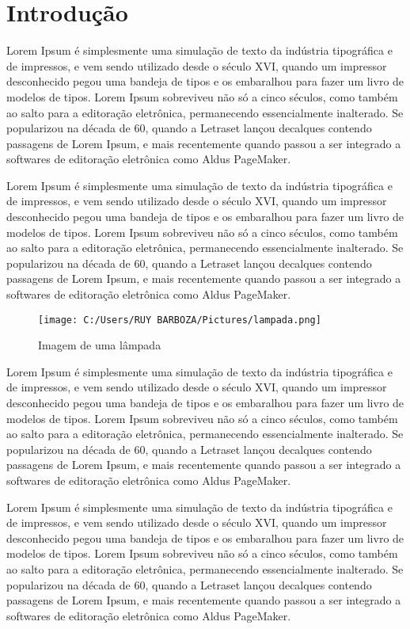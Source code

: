 \documentclass[12pt, a4paper, oneside]{book}
\begin{document}
\newpage

\chapter{Introdução}

Lorem Ipsum é simplesmente uma simulação de texto da indústria tipográfica e de impressos, e vem sendo utilizado desde o século XVI, quando um impressor desconhecido pegou uma bandeja de tipos e os embaralhou para fazer um livro de modelos de tipos. Lorem Ipsum sobreviveu não só a cinco séculos, como também ao salto para a editoração eletrônica, permanecendo essencialmente inalterado. Se popularizou na década de 60, quando a Letraset lançou decalques contendo passagens de Lorem Ipsum, e mais recentemente quando passou a ser integrado a softwares de editoração eletrônica como Aldus PageMaker.

Lorem Ipsum é simplesmente uma simulação de texto da indústria tipográfica e de impressos, e vem sendo utilizado desde o século XVI, quando um impressor desconhecido pegou uma bandeja de tipos e os embaralhou para fazer um livro de modelos de tipos. Lorem Ipsum sobreviveu não só a cinco séculos, como também ao salto para a editoração eletrônica, permanecendo essencialmente inalterado. Se popularizou na década de 60, quando a Letraset lançou decalques contendo passagens de Lorem Ipsum, e mais recentemente quando passou a ser integrado a softwares de editoração eletrônica como Aldus PageMaker.

\begin{figure} [h]
	\centering
	\texttt{[image: C:/Users/RUY BARBOZA/Pictures/lampada.png]}
	\label{ImagemLampada}			
\caption{Imagem de uma lâmpada}
\end{figure}

Lorem Ipsum é simplesmente uma simulação de texto da indústria tipográfica e de impressos, e vem sendo utilizado desde o século XVI, quando um impressor desconhecido pegou uma bandeja de tipos e os embaralhou para fazer um livro de modelos de tipos. Lorem Ipsum sobreviveu não só a cinco séculos, como também ao salto para a editoração eletrônica, permanecendo essencialmente inalterado. Se popularizou na década de 60, quando a Letraset lançou decalques contendo passagens de Lorem Ipsum, e mais recentemente quando passou a ser integrado a softwares de editoração eletrônica como Aldus PageMaker.

Lorem Ipsum é simplesmente uma simulação de texto da indústria tipográfica e de impressos, e vem sendo utilizado desde o século XVI, quando um impressor desconhecido pegou uma bandeja de tipos e os embaralhou para fazer um livro de modelos de tipos. Lorem Ipsum sobreviveu não só a cinco séculos, como também ao salto para a editoração eletrônica, permanecendo essencialmente inalterado. Se popularizou na década de 60, quando a Letraset lançou decalques contendo passagens de Lorem Ipsum, e mais recentemente quando passou a ser integrado a softwares de editoração eletrônica como Aldus PageMaker.
\end{document}
